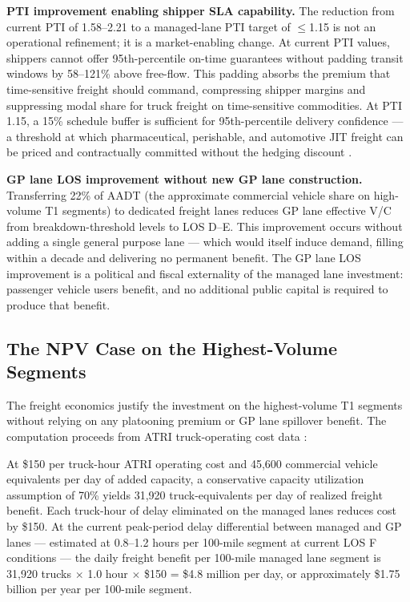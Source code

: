 \textbf{PTI improvement enabling shipper SLA capability.} The reduction from current PTI of 1.58--2.21 to a managed-lane PTI target of $\leq$1.15 is not an operational refinement; it is a market-enabling change. At current PTI values, shippers cannot offer 95th-percentile on-time guarantees without padding transit windows by 58--121\% above free-flow. This padding absorbs the premium that time-sensitive freight should command, compressing shipper margins and suppressing modal share for truck freight on time-sensitive commodities. At PTI 1.15, a 15\% schedule buffer is sufficient for 95th-percentile delivery confidence --- a threshold at which pharmaceutical, perishable, and automotive JIT freight can be priced and contractually committed without the hedging discount \citep{ATRI_costs2024}.

\textbf{GP lane LOS improvement without new GP lane construction.} Transferring 22\% of AADT (the approximate commercial vehicle share on high-volume T1 segments) to dedicated freight lanes reduces GP lane effective V/C from breakdown-threshold levels to LOS D--E. This improvement occurs without adding a single general purpose lane --- which would itself induce demand, filling within a decade and delivering no permanent benefit. The GP lane LOS improvement is a political and fiscal externality of the managed lane investment: passenger vehicle users benefit, and no additional public capital is required to produce that benefit.

\subsection*{The NPV Case on the Highest-Volume Segments}

The freight economics justify the investment on the highest-volume T1 segments without relying on any platooning premium or GP lane spillover benefit. The computation proceeds from ATRI truck-operating cost data \citep{ATRI_costs2024}:

At \$150 per truck-hour ATRI operating cost and 45,600 commercial vehicle equivalents per day of added capacity, a conservative capacity utilization assumption of 70\% yields 31,920 truck-equivalents per day of realized freight benefit. Each truck-hour of delay eliminated on the managed lanes reduces cost by \$150. At the current peak-period delay differential between managed and GP lanes --- estimated at 0.8--1.2 hours per 100-mile segment at current LOS F conditions --- the daily freight benefit per 100-mile managed lane segment is 31,920 trucks $\times$ 1.0 hour $\times$ \$150 = \$4.8 million per day, or approximately \$1.75 billion per year per 100-mile segment.

